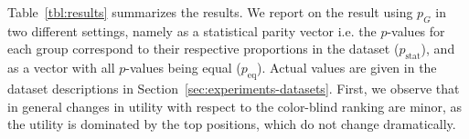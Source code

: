 %
Table~\ref{tbl:results} summarizes the results. We report on the result using $p_G$ in two different settings, namely as a statistical parity vector i.e. the $p$-values for each group correspond to their respective proportions in the dataset ($p_{\text{stat}}$), and as a vector with all $p$-values being equal ($p_{\text{eq}}$). 
%
Actual values are given in the dataset descriptions in Section~\ref{sec:experiments-datasets}. 
%
First, we observe that in general changes in utility with respect to the color-blind ranking are minor, as the utility is dominated by the top positions, which do not change dramatically.
%


